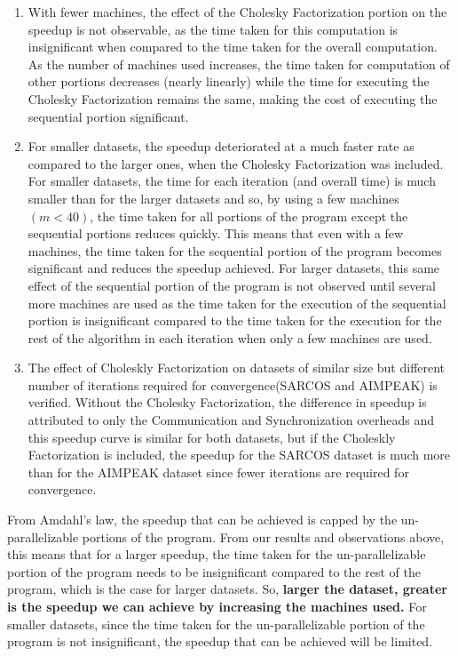 \documentclass[12pt]{article}
\begin{document}
\begin{enumerate}[label=(\alph*)]
\item With fewer machines, the effect of the Cholesky Factorization portion on the speedup is not observable, as the time taken for this computation is insignificant when compared to the time taken for the overall computation. As the number of machines used increases, the time taken for computation of other portions decreases (nearly linearly) while the time for executing the Cholesky Factorization remains the same, making the cost of executing the sequential portion significant.
\item For smaller datasets, the speedup deteriorated at a much faster rate as compared to the larger ones, when the Cholesky Factorization was included. For smaller datasets, the time for each iteration (and overall time) is much smaller than for the larger datasets and so, by using a few machines $(m < 40)$, the time taken for all portions of the program except the sequential portions reduces quickly. This means that even with a few machines, the time taken for the sequential portion of the program becomes significant and reduces the speedup achieved. For larger datasets, this same effect of the sequential portion of the program is not observed until several more machines are used as the time taken for the execution of the sequential portion is insignificant compared to the time taken for the execution for the rest of the algorithm in each iteration when only a few machines are used.
\item The effect of Choleskly Factorization on datasets of similar size but different number of iterations required for convergence(SARCOS and AIMPEAK) is verified. Without the Cholesky Factorization, the difference in speedup is attributed to only the Communication and Synchronization overheads and this speedup curve is similar for both datasets, but if the Choleskly Factorization is included, the speedup for the SARCOS dataset is much more than for the AIMPEAK dataset since fewer iterations are required for convergence.
\end{enumerate}
From Amdahl's law, the speedup that can be achieved is capped by the un-parallelizable portions of the program. From our results and observations above, this means that for a larger speedup, the time taken for the un-parallelizable portion of the program needs to be insignificant compared to the rest of the program, which is the case for larger datasets. So, {\bf larger the dataset, greater is the speedup we can achieve by increasing the machines used.} For smaller datasets, since the time taken for the un-parallelizable portion of the program is not insignificant, the speedup that can be achieved will be limited.
\end{document}
